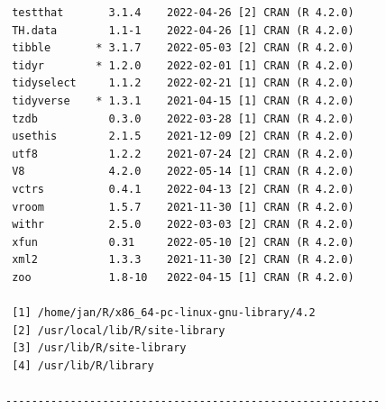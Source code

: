 \documentclass[oneside, 10pt]{book}\usepackage[]{graphicx}\usepackage[]{xcolor}
\makeatletter
\newenvironment{kframe}{%
 \def\at@end@of@kframe{}%
 \ifinner\ifhmode%
  \def\at@end@of@kframe{\end{minipage}}%
  \begin{minipage}{\columnwidth}%
 \fi\fi%
 \def\FrameCommand##1{\hskip\@totalleftmargin \hskip-\fboxsep
 \colorbox{shadecolor}{##1}\hskip-\fboxsep
     \hskip-\linewidth \hskip-\@totalleftmargin \hskip\columnwidth}%
 \MakeFramed {\advance\hsize-\width
   \@totalleftmargin\z@ \linewidth\hsize
   \@setminipage}}%
 {\par\unskip\endMakeFramed%
 \at@end@of@kframe}
\newenvironment{knitrout}{}{} %
\makeatother
\begin{document}
\begin{knitrout}
\begin{kframe}
\begin{verbatim}
 testthat       3.1.4    2022-04-26 [2] CRAN (R 4.2.0)
 TH.data        1.1-1    2022-04-26 [1] CRAN (R 4.2.0)
 tibble       * 3.1.7    2022-05-03 [2] CRAN (R 4.2.0)
 tidyr        * 1.2.0    2022-02-01 [1] CRAN (R 4.2.0)
 tidyselect     1.1.2    2022-02-21 [1] CRAN (R 4.2.0)
 tidyverse    * 1.3.1    2021-04-15 [1] CRAN (R 4.2.0)
 tzdb           0.3.0    2022-03-28 [1] CRAN (R 4.2.0)
 usethis        2.1.5    2021-12-09 [2] CRAN (R 4.2.0)
 utf8           1.2.2    2021-07-24 [2] CRAN (R 4.2.0)
 V8             4.2.0    2022-05-14 [1] CRAN (R 4.2.0)
 vctrs          0.4.1    2022-04-13 [2] CRAN (R 4.2.0)
 vroom          1.5.7    2021-11-30 [1] CRAN (R 4.2.0)
 withr          2.5.0    2022-03-03 [2] CRAN (R 4.2.0)
 xfun           0.31     2022-05-10 [2] CRAN (R 4.2.0)
 xml2           1.3.3    2021-11-30 [2] CRAN (R 4.2.0)
 zoo            1.8-10   2022-04-15 [1] CRAN (R 4.2.0)

 [1] /home/jan/R/x86_64-pc-linux-gnu-library/4.2
 [2] /usr/local/lib/R/site-library
 [3] /usr/lib/R/site-library
 [4] /usr/lib/R/library

----------------------------------------------------------
\end{verbatim}
\end{kframe}
\end{knitrout}



\end{document}
